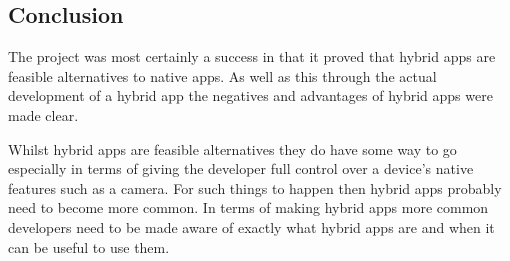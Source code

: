 \subsection{Conclusion}
The project was most certainly a success in that it proved that hybrid apps are feasible alternatives to native apps. As well as this through the actual development of a hybrid app the negatives and advantages of hybrid apps were made clear.

Whilst hybrid apps are feasible alternatives they do have some way to go especially in terms of giving the developer full control over a device's native features such as a camera. For such things to happen then hybrid apps probably need to become more common. In terms of making hybrid apps more common developers need to be made aware of exactly what hybrid apps are and when it can be useful to use them. 
